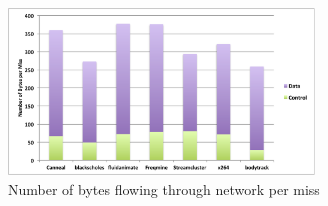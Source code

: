 \begin{figure}[h]
  \centering
  \includegraphics[height=2.2 in, width=3.2in]{figures/Network-traffic.pdf}
  \caption{Number of bytes flowing through network per miss}
  \label{fig:profile}
\end{figure}
